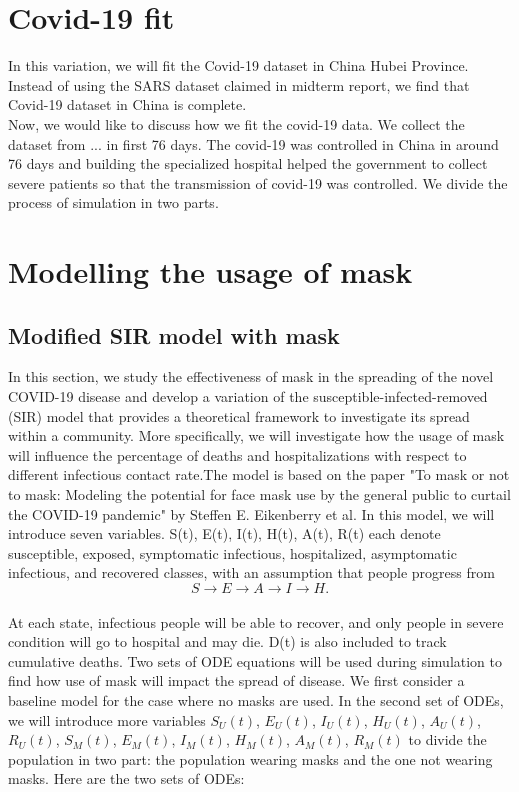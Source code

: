 \documentclass{article}
\begin{document}
 \section{Covid-19 fit}
 In this variation, we will fit the Covid-19 dataset in China Hubei Province. Instead of using the SARS dataset claimed in midterm report, we find that Covid-19 dataset in China is complete. \\

Now, we would like to discuss how we fit the covid-19 data. We collect the dataset from ... in first 76 days. The covid-19 was controlled in China in around 76 days and building the specialized hospital helped the government to collect severe patients so that the transmission of covid-19 was controlled. We divide the process of simulation in two parts. 

\section{Modelling the usage of mask}
\subsection{Modified SIR model with mask}
In this section, we study the effectiveness of mask in the spreading of the novel COVID-19 disease and develop a variation of the susceptible-infected-removed (SIR) model that provides a theoretical framework to investigate its spread within a community. More specifically, we will investigate how the usage of mask will influence the percentage of deaths and hospitalizations with respect to different infectious contact rate.The model is based on the paper "To mask or not to mask: Modeling the potential for face mask use by the general public to curtail the COVID-19 pandemic" by Steffen E. Eikenberry et al. In this model, we will introduce seven variables. S(t), E(t), I(t), H(t), A(t), R(t) each denote susceptible, exposed, symptomatic infectious, hospitalized, asymptomatic infectious, and recovered classes, with an assumption that people progress from \\
$$S \rightarrow E \rightarrow A \rightarrow I \rightarrow H. $$ \\
At each state, infectious people will be able to recover, and only people in severe condition will go to hospital and may die. D(t) is also included to track cumulative deaths. Two sets of ODE equations will be used during simulation to find how use of mask will impact the spread of disease. We first consider a baseline model for the case where no masks are used. In the second set of ODEs, we will introduce more variables
$S_{U}(t)$, $E_{U}(t)$, $I_{U}(t)$, $H_{U}(t)$, $A_{U}(t)$, $R_{U}(t)$, $S_{M}(t)$, $E_{M}(t)$, $I_{M}(t)$, $H_{M}(t)$, $A_{M}(t)$, $R_{M}(t)$ to divide the population in two part: the population wearing masks and the one not wearing masks.
Here are the two sets of ODEs:\\
\end{document}
